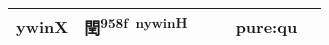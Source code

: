 \documentclass[14pt,a4paper]{scrartcl}
\begin{document}
\begin{longtable}[c]{@{}llllll@{}}
\begin{minipage}[t]{0.14\columnwidth}
ywinX
\strut\end{minipage} &
\begin{minipage}[t]{0.14\columnwidth}\raggedright\strut
閏\textsuperscript{958f~nywinH}
\strut\end{minipage} &
\begin{minipage}[t]{0.14\columnwidth}\raggedright\strut
\strut\end{minipage} &
\begin{minipage}[t]{0.14\columnwidth}\raggedright\strut
\strut\end{minipage} &
\begin{minipage}[t]{0.14\columnwidth}\raggedright\strut
pure:qu
\strut\end{minipage}\tabularnewline
\bottomrule
\end{longtable}
\end{document}
